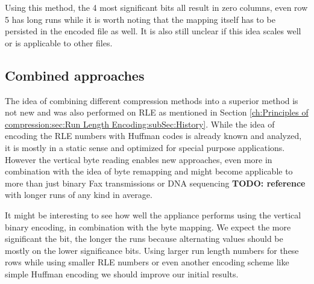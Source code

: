 \par{
\arraydump\dataC

Using this method, the 4 most significant bits all result in zero columns, even row 5 has long runs while it is worth noting that the mapping itself has to be persisted in the encoded file as well. It is also still unclear if this idea scales well or is applicable to other files.
}

\subsection{Combined approaches}
\par{
The idea of combining different compression methods into a superior method is not new and was also performed on RLE as mentioned in Section \ref{ch:Principles of compression:sec:Run Length Encoding:subSec:History}. While the idea of encoding the RLE numbers with Huffman codes is already known and analyzed, it is mostly in a static sense and optimized for special purpose applications. However the vertical byte reading enables new approaches, even more in combination with the idea of byte remapping and might become applicable to more than just binary Fax transmissions or DNA sequencing \textbf{TODO: reference} with longer runs of any kind in average.
}
\par{
It might be interesting to see how well the appliance performs using the vertical binary encoding, in combination with the byte mapping. We expect the more significant the bit, the longer the runs because alternating values should be mostly on the lower significance bits. Using larger run length numbers for these rows while using smaller RLE numbers or even another encoding scheme like simple Huffman encoding we should improve our initial results.
}

